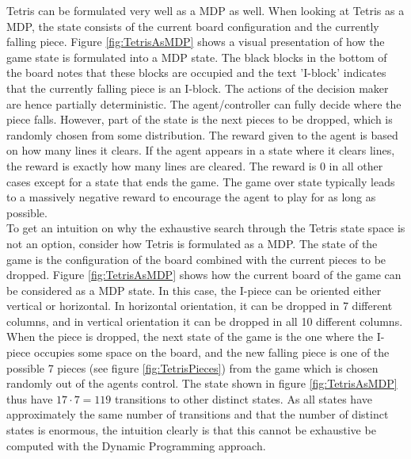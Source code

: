 Tetris can be formulated very well as a MDP as well.
When looking at Tetris as a MDP, the state consists
of the current board configuration and the currently falling piece.
Figure \ref{fig:TetrisAsMDP} shows a visual presentation 
of how the game state is formulated into a MDP state. The black
blocks in the bottom of the board notes that these blocks are 
occupied and the text 'I-block' indicates that the currently
falling piece is an I-block.
The actions of the decision maker are hence partially deterministic.
The agent/controller can fully decide where the piece falls. However,
part of the state is the next pieces to be dropped, which is
randomly chosen from some distribution. The reward given to the agent
is based on how many lines it clears. If the agent appears in a state 
where it clears lines, the reward is exactly how many lines are cleared.
The reward is 0 in all other cases except for a state that ends the game.
The game over state typically leads to a massively negative reward to 
encourage the agent to play for as long as possible.\\
To get an intuition on why the exhaustive search through the Tetris 
state space is not an option, consider how Tetris is formulated as a MDP.
The state of the game is the configuration of the board combined with 
the current pieces to be dropped. Figure \ref{fig:TetrisAsMDP} shows
how the current board of the game can be considered as a MDP state. 
In this case, the I-piece can be oriented either vertical or horizontal. 
In horizontal orientation, it can be dropped in 7 different columns,
and in vertical orientation it can be dropped in all 10 different columns.
When the piece is dropped, the next state of the game is the one 
where the I-piece occupies some space on the board, and the new falling piece
is one of the possible 7 pieces (see figure \ref{fig:TetrisPieces}) 
from the game which is chosen randomly 
out of the agents control. The state shown in figure \ref{fig:TetrisAsMDP}
thus have $17 \cdot 7 = 119$ transitions to other distinct states.
As all states have approximately the same number of transitions
and that the number of distinct states is enormous, the intuition 
clearly is that this cannot be exhaustive be computed with the Dynamic 
Programming approach.
